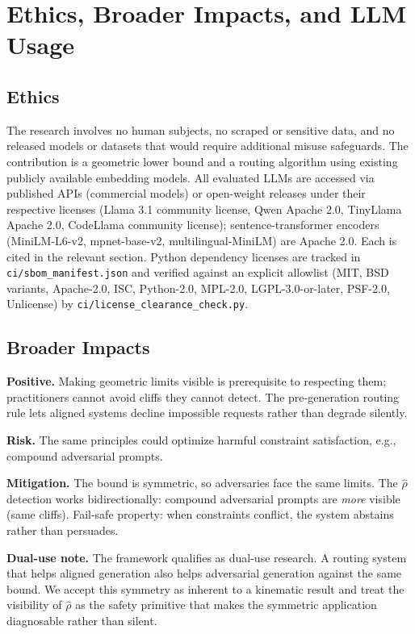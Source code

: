 \section{Ethics, Broader Impacts, and LLM Usage}\label{sec:ethics}

\subsection{Ethics}\label{sec:ethics_compliance}
The research involves no human subjects, no scraped or sensitive data, and no released models or datasets that would require additional misuse safeguards. The contribution is a geometric lower bound and a routing algorithm using existing publicly available embedding models. All evaluated LLMs are accessed via published APIs (commercial models) or open-weight releases under their respective licenses (Llama 3.1 community license, Qwen Apache 2.0, TinyLlama Apache 2.0, CodeLlama community license); sentence-transformer encoders (MiniLM-L6-v2, mpnet-base-v2, multilingual-MiniLM) are Apache 2.0. Each is cited in the relevant section. Python dependency licenses are tracked in \texttt{ci/sbom\_manifest.json} and verified against an explicit allowlist (MIT, BSD variants, Apache-2.0, ISC, Python-2.0, MPL-2.0, LGPL-3.0-or-later, PSF-2.0, Unlicense) by \texttt{ci/license\_clearance\_check.py}.

\subsection{Broader Impacts}\label{sec:impacts}
\textbf{Positive.} Making geometric limits visible is prerequisite to respecting them; practitioners cannot avoid cliffs they cannot detect. The pre-generation routing rule lets aligned systems decline impossible requests rather than degrade silently.

\textbf{Risk.} The same principles could optimize harmful constraint satisfaction, e.g., compound adversarial prompts.

\textbf{Mitigation.} The bound is symmetric, so adversaries face the same limits. The $\hat{\rho}$ detection works bidirectionally: compound adversarial prompts are \emph{more} visible (same cliffs). Fail-safe property: when constraints conflict, the system abstains rather than persuades.

\textbf{Dual-use note.} The framework qualifies as dual-use research. A routing system that helps aligned generation also helps adversarial generation against the same bound. We accept this symmetry as inherent to a kinematic result and treat the visibility of $\hat{\rho}$ as the safety primitive that makes the symmetric application diagnosable rather than silent.

